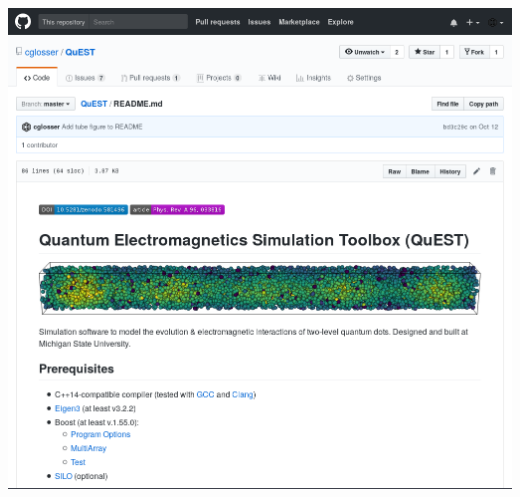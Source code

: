 \documentclass[aspectratio=169]{beamer}
\begin{document}
\begin{frame}
  \centering
  \vspace{0.5cm}
  \includegraphics[height=\textheight]{figures/github.png}
\end{frame}
\end{document}
